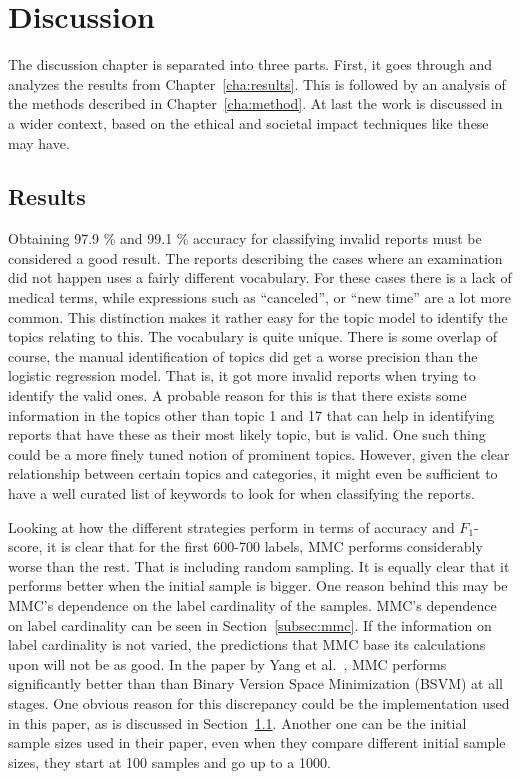 \chapter{Discussion}
\label{cha:discussion}

The discussion chapter is separated into three parts.
First, it goes through and analyzes the results from Chapter~\ref{cha:results}.
This is followed by an analysis of the methods described in Chapter~\ref{cha:method}.
At last the work is discussed in a wider context, based on the ethical and societal impact techniques like these may have.

\section{Results}
\label{sec:discussion-results}

Obtaining 97.9 \% and 99.1 \% accuracy for classifying invalid reports must be considered a good result.
The reports describing the cases where an examination did not happen uses a fairly different vocabulary.
For these cases there is a lack of medical terms, while expressions such as ``canceled'', or ``new time'' are a lot more common.
This distinction makes it rather easy for the topic model to identify the topics relating to this.
The vocabulary is quite unique.
There is some overlap of course, the manual identification of topics did get a worse precision than the logistic regression model.
That is, it got more invalid reports when trying to identify the valid ones.
A probable reason for this is that there exists some information in the topics other than topic 1 and 17 that can help in identifying reports that have these as their most likely topic, but is valid.
One such thing could be a more finely tuned notion of prominent topics.
However, given the clear relationship between certain topics and categories, it might even be sufficient to have a well curated list of keywords to look for when classifying the reports.

Looking at how the different strategies perform in terms of accuracy and $F_1$-score, it is clear that for the first 600-700 labels, MMC performs considerably worse than the rest.
That is including random sampling.
It is equally clear that it performs better when the initial sample is bigger.
One reason behind this may be MMC's dependence on the label cardinality of the samples.
MMC's dependence on label cardinality can be seen in Section~\ref{subsec:mmc}.
If the information on label cardinality is not varied, the predictions that MMC base its calculations upon will not be as good.
In the paper by Yang et al\@.~\cite{yang2009effective}, MMC performs significantly better than than Binary Version Space Minimization (BSVM) at all stages.
One obvious reason for this discrepancy could be the implementation used in this paper, as is discussed in Section~\ref{sec:discussion-results}.
Another one can be the initial sample sizes used in their paper, even when they compare different initial sample sizes, they start at 100 samples and go up to a 1000.

